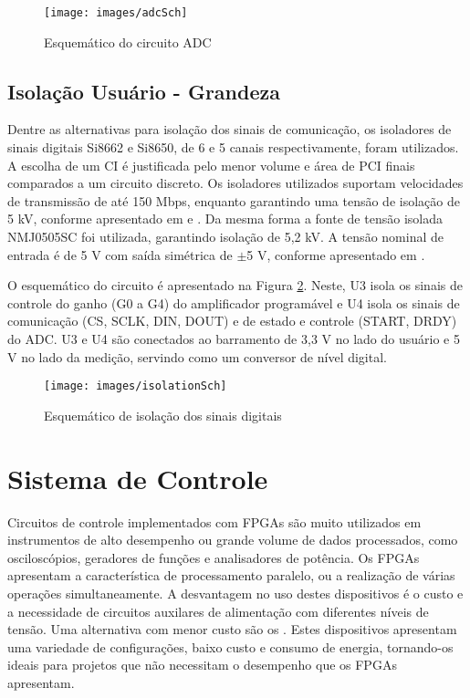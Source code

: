 				\begin{figure}[h]
					\caption{Esquemático do circuito ADC}
					\label{img:hw:sch:adc}
					\texttt{[image: images/adcSch]}
				\end{figure}


			\subsection{Isolação Usuário - Grandeza}\label{sec:hw:sch:iso}

				Dentre as alternativas para isolação dos sinais de comunicação, os isoladores de sinais digitais Si8662 e Si8650, de 6 e 5 canais respectivamente, foram utilizados. A escolha de um CI é justificada pelo menor volume e área de PCI finais comparados a um circuito discreto. Os isoladores utilizados suportam velocidades de transmissão de até 150 Mbps, enquanto garantindo uma tensão de isolação de 5 kV, conforme apresentado em \cite{silicon6ch} e \cite{silicon5ch}. Da mesma forma a fonte de tensão isolada NMJ0505SC foi utilizada, garantindo isolação de 5,2 kV. A tensão nominal de entrada é de 5 V com saída simétrica de $\pm$5 V, conforme apresentado em \cite{murataPSU}.

				O esquemático do circuito é apresentado na Figura \ref{img:hw:sch:iso}. Neste, U3 isola os sinais de controle do ganho (G0 a G4) do amplificador programável e U4 isola os sinais de comunicação (CS, SCLK, DIN, DOUT) e de estado e controle (START, DRDY) do ADC. U3 e U4 são conectados ao barramento de 3,3 V no lado do usuário e 5 V no lado da medição, servindo como um conversor de nível digital.

				\begin{figure}[h]
					\caption{Esquemático de isolação dos sinais digitais}
					\label{img:hw:sch:iso}
					\texttt{[image: images/isolationSch]}
				\end{figure}


	\section{Sistema de Controle}\label{sec:hw:control}

		Circuitos de controle implementados com FPGAs são muito utilizados em instrumentos de alto desempenho ou grande volume de dados processados, como osciloscópios, geradores de funções e analisadores de potência. Os FPGAs apresentam a característica de processamento paralelo, ou a realização de várias operações simultaneamente. A desvantagem no uso destes dispositivos é o custo e a necessidade de circuitos auxilares de alimentação com diferentes níveis de tensão. Uma alternativa com menor custo são os . Estes dispositivos apresentam uma variedade de configurações, baixo custo e consumo de energia, tornando-os ideais para projetos que não necessitam o desempenho que os FPGAs apresentam.


